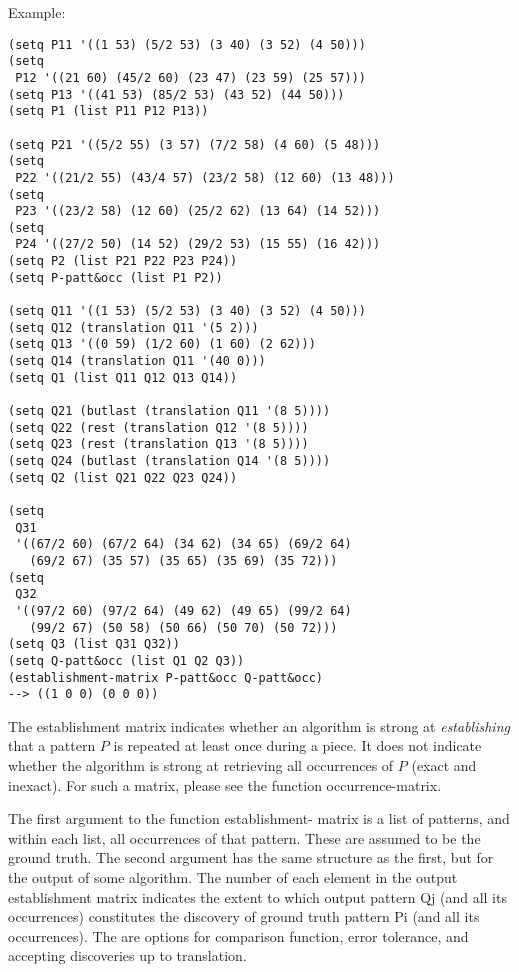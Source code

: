 \vspace{0.5cm}
\noindent Example:
\begin{verbatim}
(setq P11 '((1 53) (5/2 53) (3 40) (3 52) (4 50)))
(setq
 P12 '((21 60) (45/2 60) (23 47) (23 59) (25 57)))
(setq P13 '((41 53) (85/2 53) (43 52) (44 50)))
(setq P1 (list P11 P12 P13))

(setq P21 '((5/2 55) (3 57) (7/2 58) (4 60) (5 48)))
(setq
 P22 '((21/2 55) (43/4 57) (23/2 58) (12 60) (13 48)))
(setq
 P23 '((23/2 58) (12 60) (25/2 62) (13 64) (14 52)))
(setq
 P24 '((27/2 50) (14 52) (29/2 53) (15 55) (16 42)))
(setq P2 (list P21 P22 P23 P24))
(setq P-patt&occ (list P1 P2))

(setq Q11 '((1 53) (5/2 53) (3 40) (3 52) (4 50)))
(setq Q12 (translation Q11 '(5 2)))
(setq Q13 '((0 59) (1/2 60) (1 60) (2 62)))
(setq Q14 (translation Q11 '(40 0)))
(setq Q1 (list Q11 Q12 Q13 Q14))

(setq Q21 (butlast (translation Q11 '(8 5))))
(setq Q22 (rest (translation Q12 '(8 5))))
(setq Q23 (rest (translation Q13 '(8 5))))
(setq Q24 (butlast (translation Q14 '(8 5))))
(setq Q2 (list Q21 Q22 Q23 Q24))

(setq
 Q31
 '((67/2 60) (67/2 64) (34 62) (34 65) (69/2 64)
   (69/2 67) (35 57) (35 65) (35 69) (35 72)))
(setq
 Q32
 '((97/2 60) (97/2 64) (49 62) (49 65) (99/2 64)
   (99/2 67) (50 58) (50 66) (50 70) (50 72)))
(setq Q3 (list Q31 Q32))
(setq Q-patt&occ (list Q1 Q2 Q3))
(establishment-matrix P-patt&occ Q-patt&occ)
--> ((1 0 0) (0 0 0))
\end{verbatim}

\noindent The establishment matrix indicates whether
an algorithm is strong at \emph{establishing} that a
pattern $P$ is repeated at least once during a piece.
It does not indicate whether the algorithm is strong
at retrieving all occurrences of $P$ (exact and
inexact). For such a matrix, please see the function
occurrence-matrix.

The first argument to the function establishment-
matrix is a list of patterns, and within each list,
all occurrences of that pattern. These are assumed to
be the ground truth. The second argument has the same
structure as the first, but for the output of some
algorithm. The number of each element in the output
establishment matrix indicates the extent to which
output pattern Qj (and all its occurrences)
constitutes the discovery of ground truth pattern Pi
(and all its occurrences). The are options for
comparison function, error tolerance, and accepting
discoveries up to translation.

